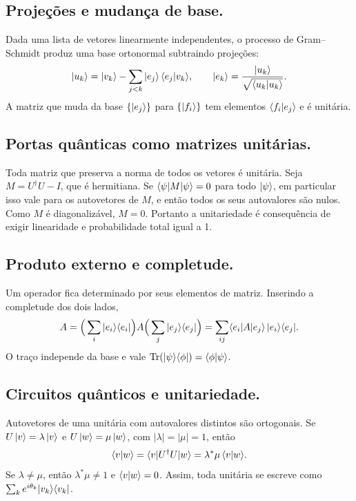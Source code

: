 \subsection{Projeções e mudança de base.}
Dada uma lista de vetores linearmente independentes, o processo de Gram--Schmidt produz uma base ortonormal subtraindo projeções:
\begin{equation}
    \ket{u_k} = \ket{v_k} - \sum_{j<k} \ket{e_j}\braket{e_j}{v_k}, \qquad \ket{e_k} = \frac{\ket{u_k}}{\sqrt{\braket{u_k}{u_k}}}.
\end{equation}
A matriz que muda da base $\{\ket{e_j}\}$ para $\{\ket{f_i}\}$ tem elementos $\braket{f_i}{e_j}$ e é unitária.

\subsection{Portas quânticas como matrizes unitárias.}
Toda matriz que preserva a norma de todos os vetores é unitária. Seja $M = U^\dagger U - I$, que é hermitiana. Se $\Braket{\psi}{M}{\psi}=0$ para todo $\ket{\psi}$, em particular isso vale para os autovetores de $M$, e então todos os seus autovalores são nulos. Como $M$ é diagonalizável, $M=0$. Portanto a unitariedade é consequência de exigir linearidade e probabilidade total igual a 1.

\subsection{Produto externo e completude.}
Um operador fica determinado por seus elementos de matriz. Inserindo a completude dos dois lados,
\begin{equation}
    A = \Big(\sum_i \ketbra{e_i}{e_i}\Big) A \Big(\sum_j \ketbra{e_j}{e_j}\Big) = \sum_{ij} \Braket{e_i}{A}{e_j}\,\ketbra{e_i}{e_j}.
\end{equation}
O traço independe da base e vale $\Tr(\ketbra{\psi}{\phi}) = \braket{\phi}{\psi}$.

\subsection{Circuitos quânticos e unitariedade.}
Autovetores de uma unitária com autovalores distintos são ortogonais. Se $U\ket{v}=\lambda\ket{v}$ e $U\ket{w}=\mu\ket{w}$, com $|\lambda|=|\mu|=1$, então
\begin{equation}
    \braket{v}{w} = \Braket{v}{U^\dagger U}{w} = \lambda^*\mu\,\braket{v}{w}.
\end{equation}
Se $\lambda\ne\mu$, então $\lambda^*\mu \neq 1$ e $\braket{v}{w}=0$. Assim, toda unitária se escreve como $\sum_k e^{i\theta_k}\ketbra{v_k}{v_k}$.

